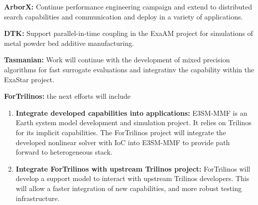 {\bf ArborX:} Continue performance engineering campaign and extend to
distributed search capabilities and communication and deploy in a variety of
applications.

{\bf DTK:} Support parallel-in-time coupling in the ExaAM project for
simulations of metal powder bed additive manufacturing.

{\bf Tasmanian:} Work will continue with the development of mixed precision
algorithms for fast surrogate evaluations and integratinv the capability within
the ExaStar project.

{\bf ForTrilinos:} the next efforts will include
\begin{enumerate}
  \item \textbf{Integrate developed capabilities into applications:} E3SM-MMF
    is an Earth system model development and simulation project. It relies on
    Trilinos for its implicit capabilities. The ForTrilinos project will
    integrate the developed nonlinear solver with IoC into E3SM-MMF to provide
    path forward to heterogeneous stack.
  \item \textbf{Integrate ForTrilinos with upstream Trilinos project:}
    ForTrilinos will develop a support model to interact with upstream Trilinos
    developers. This will allow a faster integration of new capabilities, and
    more robust testing infrastructure.
\end{enumerate}

